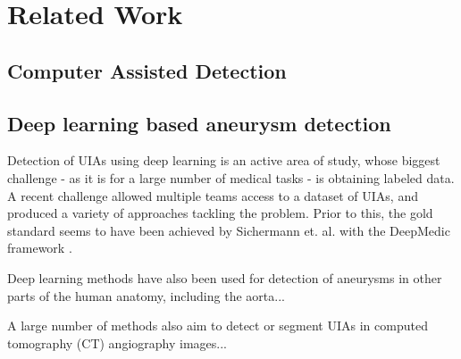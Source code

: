 \chapter{Related Work}


\section{Computer Assisted Detection}


\section{Deep learning based aneurysm detection}
Detection of UIAs using deep learning is an active area of study, whose biggest challenge - as it is for a large number of medical tasks - is obtaining labeled data. A recent challenge  allowed multiple teams access to a dataset of UIAs, and produced a variety of approaches tackling the problem. Prior to this, the gold standard seems to have been achieved by Sichermann et. al. \cite{Sichermann2019} with the DeepMedic framework \cite{deepmedic}.

Deep learning methods have also been used for detection of aneurysms in other parts of the human anatomy, including the aorta... 

A large number of methods also aim to detect or segment UIAs in computed tomography (CT) angiography images...








